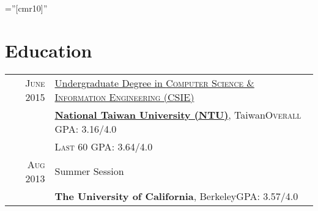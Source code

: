 \documentclass[a4paper,11pt]{article} %
\begin{document}
\pagestyle{empty} %

\font\fb=''[cmr10]'' %

\par{\par} %





\section{Education}

\begin{tabular}{rl}	
\textsc{June} 2015& \href{https://www.csie.ntu.edu.tw}{Undergraduate Degree in \textsc{}\textsc{Computer Science \& Information Engineering (CSIE)}} \\
&\normalsize\textbf{\href{https://www.csie.ntu.edu.tw}{National Taiwan University (NTU)}}, Taiwan\hfill \normalsize \textsc{Overall GPA}: 3.16/4.0 \\
& \hfill \normalsize\textsc{ Last 60 GPA}: 3.64/4.0\\

\textsc{Aug} 2013& Summer Session\\
&\normalsize\textbf{The University of California}, Berkeley\hfill \normalsize \textsc{GPA}: 3.57/4.0 \\

\end{tabular}
\end{document}
